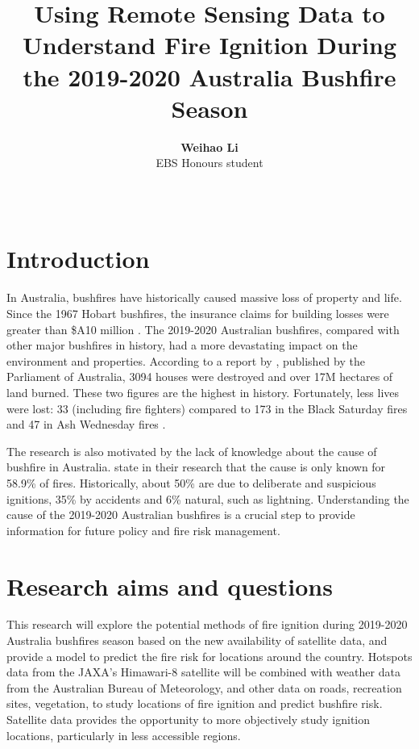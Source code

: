 \documentclass[11pt,a4paper,]{article}
\title{Using Remote Sensing Data to Understand Fire Ignition During the 2019-2020 Australia Bushfire Season}
\author{\sf\Large\textbf{ Weihao Li}\\ {\sf\large EBS Honours student\\[0.5cm]}}
\date{\sf\Date~\Month~\Year}
\makeatletter
\def\titlepage{\front{\expandafter{\@title}}{\@author}{\@organization}}
\makeatother
\begin{document}
\titlepage

\hypertarget{introduction}{%
\section{Introduction}\label{introduction}}

In Australia, bushfires have historically caused massive loss of property and life. Since the 1967 Hobart bushfires, the insurance claims for building losses were greater than \$A10 million \autocite{mcaneney2009100}.
The 2019-2020 Australian bushfires, compared with other major bushfires in history, had a more devastating impact on the environment and properties. According to a report by \textcite{LisaRichardsNigelBrew2020}, published by the Parliament of Australia, 3094 houses were destroyed and over 17M hectares of land burned. These two figures are the highest in history. Fortunately, less lives were lost: 33 (including fire fighters) compared to 173 in the Black Saturday fires and 47 in Ash Wednesday fires \autocite{LisaRichardsNigelBrew2020}.

The research is also motivated by the lack of knowledge about the cause of bushfire in Australia. \textcite{beale2011preventing} state in their research that the cause is only known for 58.9\% of fires. Historically, about 50\% are due to deliberate and suspicious ignitions, 35\% by accidents and 6\% natural, such as lightning. Understanding the cause of the 2019-2020 Australian bushfires is a crucial step to provide information for future policy and fire risk management.

\hypertarget{research-aims-and-questions}{%
\section{Research aims and questions}\label{research-aims-and-questions}}

This research will explore the potential methods of fire ignition during 2019-2020 Australia bushfires season based on the new availability of satellite data, and provide a model to predict the fire risk for locations around the country. Hotspots data from the JAXA's Himawari-8 satellite will be combined with weather data from the Australian Bureau of Meteorology, and other data on roads, recreation sites, vegetation, to study locations of fire ignition and predict bushfire risk. Satellite data provides the opportunity to more objectively study ignition locations, particularly in less accessible regions.
\end{document}
